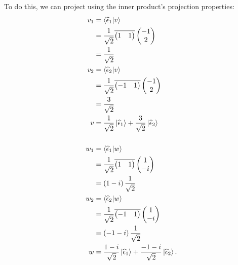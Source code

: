 \documentclass[10pt]{mypackage}
\begin{document}
\begin{example}
To do this, we can project using the inner product's projection properties:
\begin{align*}
  v_1 &= \braket{\widehat{\epsilon}_1}{v}\\
      &= \frac{1}{\sqrt{2}} \overline{\begin{pmatrix}1 & 1\end{pmatrix}} \begin{pmatrix}-1\\2\end{pmatrix}\\
      &= \frac{1}{\sqrt{2}}\\
  v_2 &= \braket{\widehat{\epsilon}_2}{v}\\
      &= \frac{1}{\sqrt{2}}\overline{ \begin{pmatrix}-1 & 1\end{pmatrix} } \begin{pmatrix}-1\\2\end{pmatrix}\\
      &= \frac{3}{\sqrt{2}}\\
  v &= \frac{1}{\sqrt{2}}\ket{\widehat{\epsilon}_1} + \frac{3}{\sqrt{2}}\ket{\widehat{\epsilon}_2}\\
  \\
  w_1 &= \braket{\widehat{\epsilon}_1}{w}\\
      &= \frac{1}{\sqrt{2}} \overline{ \begin{pmatrix}1 & 1\end{pmatrix} } \begin{pmatrix}1\\-i\end{pmatrix}\\
      &= \left(1-i\right)\frac{1}{\sqrt{2}}\\
  w_2 &= \braket{\widehat{\epsilon}_2}{w}\\
      &= \frac{1}{\sqrt{2}} \overline{ \begin{pmatrix}-1 & 1\end{pmatrix} } \begin{pmatrix}1\\-i\end{pmatrix}\\
      &= \left(-1-i\right)\frac{1}{\sqrt{2}}\\
  w &= \frac{1-i}{\sqrt{2}}\ket{\widehat{\epsilon}_1} + \frac{-1-i}{\sqrt{2}}\ket{\widehat{\epsilon}_2}.
\end{align*}
\end{example}
\end{document}
